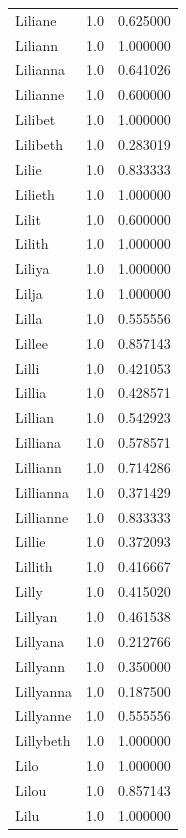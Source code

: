 \documentclass[
  letterpaper,
  DIV=11,
  numbers=noendperiod]{scrreprt}
\begin{document}
\begin{tabular}{lrr}
Liliane         &   1.0 &   0.625000 \\
Liliann         &   1.0 &   1.000000 \\
Lilianna        &   1.0 &   0.641026 \\
Lilianne        &   1.0 &   0.600000 \\
Lilibet         &   1.0 &   1.000000 \\
Lilibeth        &   1.0 &   0.283019 \\
Lilie           &   1.0 &   0.833333 \\
Lilieth         &   1.0 &   1.000000 \\
Lilit           &   1.0 &   0.600000 \\
Lilith          &   1.0 &   1.000000 \\
Liliya          &   1.0 &   1.000000 \\
Lilja           &   1.0 &   1.000000 \\
Lilla           &   1.0 &   0.555556 \\
Lillee          &   1.0 &   0.857143 \\
Lilli           &   1.0 &   0.421053 \\
Lillia          &   1.0 &   0.428571 \\
Lillian         &   1.0 &   0.542923 \\
Lilliana        &   1.0 &   0.578571 \\
Lilliann        &   1.0 &   0.714286 \\
Lillianna       &   1.0 &   0.371429 \\
Lillianne       &   1.0 &   0.833333 \\
Lillie          &   1.0 &   0.372093 \\
Lillith         &   1.0 &   0.416667 \\
Lilly           &   1.0 &   0.415020 \\
Lillyan         &   1.0 &   0.461538 \\
Lillyana        &   1.0 &   0.212766 \\
Lillyann        &   1.0 &   0.350000 \\
Lillyanna       &   1.0 &   0.187500 \\
Lillyanne       &   1.0 &   0.555556 \\
Lillybeth       &   1.0 &   1.000000 \\
Lilo            &   1.0 &   1.000000 \\
Lilou           &   1.0 &   0.857143 \\
Lilu            &   1.0 &   1.000000 \\

\end{tabular}
\end{document}
